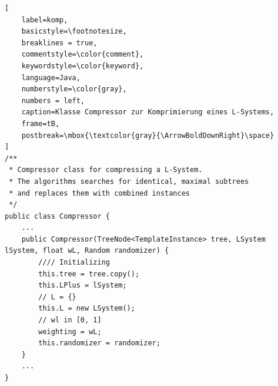 \begin{lstlisting}[
    label=komp,
    basicstyle=\footnotesize,
    breaklines = true,
    commentstyle=\color{comment},
    keywordstyle=\color{keyword},
    language=Java,
    numberstyle=\color{gray},
    numbers = left,
    caption=Klasse Compressor zur Komprimierung eines L-Systems,
    frame=tB,
    postbreak=\mbox{\textcolor{gray}{\ArrowBoldDownRight}\space}
]
/**
 * Compressor class for compressing a L-System.
 * The algorithms searches for identical, maximal subtrees
 * and replaces them with combined instances
 */
public class Compressor {
    ...
    public Compressor(TreeNode<TemplateInstance> tree, LSystem lSystem, float wL, Random randomizer) {
        //// Initializing
        this.tree = tree.copy();
        this.LPlus = lSystem;
        // L = {}
        this.L = new LSystem();
        // wl in [0, 1]
        weighting = wL;
        this.randomizer = randomizer;
    }
    ...
}
\end{lstlisting}


